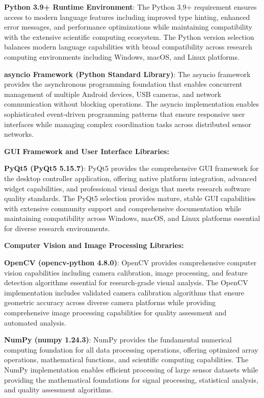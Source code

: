 \documentclass[12pt,a4paper]{report}
\begin{document}
\textbf{Python 3.9+ Runtime Environment}: The Python 3.9+ requirement ensures access to modern language features including
improved type hinting, enhanced error messages, and performance optimizations while maintaining compatibility with the
extensive scientific computing ecosystem. The Python version selection balances modern language capabilities with broad
compatibility across research computing environments including Windows, macOS, and Linux platforms.

\textbf{asyncio Framework (Python Standard Library)}: The asyncio framework provides the asynchronous programming foundation
that enables concurrent management of multiple Android devices, USB cameras, and network communication without blocking
operations. The asyncio implementation enables sophisticated event-driven programming patterns that ensure responsive
user interfaces while managing complex coordination tasks across distributed sensor networks.

\textbf{GUI Framework and User Interface Libraries:}

\textbf{PyQt5 (PyQt5 5.15.7)}: PyQt5 provides the comprehensive GUI framework for the desktop controller application,
offering native platform integration, advanced widget capabilities, and professional visual design that meets research
software quality standards. The PyQt5 selection provides mature, stable GUI capabilities with extensive community
support and comprehensive documentation while maintaining compatibility across Windows, macOS, and Linux platforms
essential for diverse research environments.

\textbf{Computer Vision and Image Processing Libraries:}

\textbf{OpenCV (opencv-python 4.8.0)}: OpenCV provides comprehensive computer vision capabilities including camera
calibration, image processing, and feature detection algorithms essential for research-grade visual analysis. The OpenCV
implementation includes validated camera calibration algorithms that ensure geometric accuracy across diverse camera
platforms while providing comprehensive image processing capabilities for quality assessment and automated analysis.

\textbf{NumPy (numpy 1.24.3)}: NumPy provides the fundamental numerical computing foundation for all data processing
operations, offering optimized array operations, mathematical functions, and scientific computing capabilities. The
NumPy implementation enables efficient processing of large sensor datasets while providing the mathematical foundations
for signal processing, statistical analysis, and quality assessment algorithms.
\end{document}
